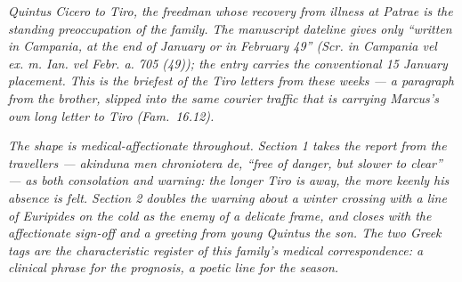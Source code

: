 
\textit{Quintus Cicero to Tiro, the freedman whose
recovery from illness at Patrae is the standing
preoccupation of the family. The manuscript dateline
gives only ``written in Campania, at the end of
January or in February 49'' (\textit{Scr. in Campania
vel ex. m. Ian. vel Febr. a. 705 (49)}); the entry
carries the conventional 15 January placement. This is
the briefest of the Tiro letters from these weeks ---
a paragraph from the brother, slipped into the same
courier traffic that is carrying Marcus's own long
letter to Tiro (\textit{Fam.}~16.12).}

\textit{The shape is medical-affectionate throughout.
Section 1 takes the report from the travellers ---
\textit{akinduna men chroniotera de}, ``free of
danger, but slower to clear'' --- as both consolation
and warning: the longer Tiro is away, the more keenly
his absence is felt. Section 2 doubles the warning
about a winter crossing with a line of Euripides on
the cold as the enemy of a delicate frame, and closes
with the affectionate sign-off and a greeting from
young Quintus the son. The two Greek tags are the
characteristic register of this family's medical
correspondence: a clinical phrase for the prognosis,
a poetic line for the season.}
